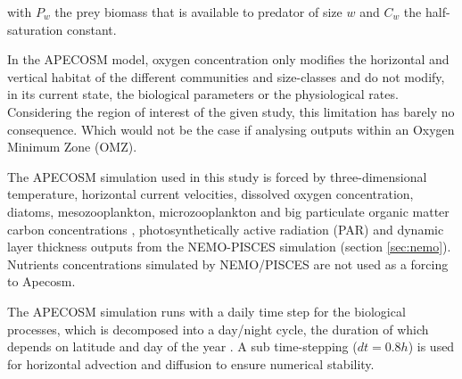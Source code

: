 with $P_{w}$ the prey biomass that is available to predator of size $w$ and $C_{w}$ the half-saturation constant.

In the APECOSM model, oxygen concentration only modifies the horizontal and vertical habitat of the different communities and size-classes and do not modify, in its current state, the  biological parameters or the physiological rates. Considering the region of interest of the given study, this limitation has barely no consequence. Which would not be the case if analysing outputs within an Oxygen Minimum Zone (OMZ). 



The APECOSM simulation used in this study is forced by three-dimensional temperature, horizontal current velocities, dissolved oxygen concentration, diatoms, mesozooplankton, microzooplankton and big particulate organic matter carbon concentrations \citep{aumontPISCESv2OceanBiogeochemical2015}, photosynthetically active radiation (PAR) and dynamic layer thickness outputs from the NEMO-PISCES simulation (section \ref{sec:nemo}). Nutrients concentrations simulated by NEMO/PISCES are not used as a forcing to Apecosm.

The APECOSM simulation runs with a daily time step for the biological processes, which is decomposed into a day/night cycle, the duration of which  depends on latitude and day of the year \citep{forsytheModelComparisonDaylength1995}. A sub time-stepping ($dt =0.8h$) is used for horizontal advection and diffusion to ensure numerical stability.

